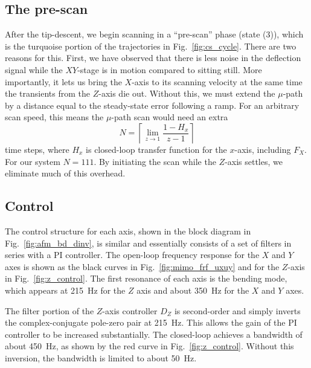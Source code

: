 \documentclass[twocolumn,oneside]{IEEEtran/IEEEtran}
\begin{document}
\subsection{The pre-scan}
After the tip-descent, we begin scanning in a ``pre-scan'' phase
(state (3)), which is the turquoise portion of the trajectories in Fig.~\ref{fig:cs_cycle}.
There are two reasons for this. First, we have observed that there is less noise in the deflection signal while the $XY$-stage is in motion compared to sitting still. More importantly, it lets us bring the $X$-axis to its scanning velocity at the same time the transients from the $Z$-axis die out. Without this, we must extend the $\mu$-path by a distance equal to the steady-state error following a ramp. For an arbitrary scan speed, this means the $\mu$-path scan would need an extra 
\begin{equation}
  N = \left\lceil\lim_{z\rightarrow 1} \frac{1-H_x}{z-1}\right\rceil
\end{equation}
time steps, where $H_x$ is closed-loop transfer function for the $x$-axis, including $F_X$.
For our system $N=111$. By initiating the scan while the $Z$-axis settles, we eliminate much of
this overhead.

\subsection{Control}\label{sec:control}
%   
The control structure for each axis, shown in the block diagram in
Fig.~\ref{fig:afm_bd_dinv}, is similar and essentially consists of a
set of filters in series with a PI controller. The open-loop frequency
response for the $X$ and $Y$ axes is shown as the black curves in Fig.~\ref{fig:mimo_frf_uxuy} and for the $Z$-axis in Fig.~\ref{fig:z_control}. The first resonance of each axis is the bending mode, which
appears at 215~Hz for the $Z$ axis and about 350~Hz for the $X$ and
$Y$ axes.

The filter portion of the $Z$-axis controller $D_Z$ is second-order
and simply inverts the complex-conjugate pole-zero pair at 215~Hz.
This allows the gain of the PI controller to be increased
substantially. The closed-loop achieves a bandwidth of about 450~Hz,
as shown by the red curve in Fig.~\ref{fig:z_control}. Without this
inversion, the bandwidth is limited to about 50~Hz.
\end{document}
